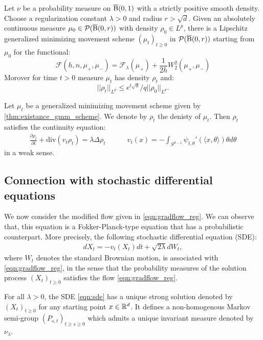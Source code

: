\begin{thm} \label{thm:existance_gmm_scheme}
Let $\nu$ be a probability measure on $\operatorname{\overline{B}}(0,1)$ with a strictly positive smooth density. Choose a regularization constant $\lambda > 0$ and radius $r > \sqrt{d}$. Given an absolutely continuous measure $\mu_0 \in \mathcal{P}(\operatorname{\overline{B}}(0,r))$ with density $\rho_0 \in L^p$, there is a Lipschitz generalized minimizing movement scheme $(\mu_t)_{t\geq 0}$ in $\mathcal{P}(\operatorname{\overline{B}}(0,r))$ starting from $\mu_0$ for the functional:
\[
\mathcal{F}(h, n , \mu_+, \mu_-) = \mathcal{F}_{\lambda}(\mu_+) + \frac{1}{2h}W_2^2(\mu_+, \mu_-)
\]
Morover for time $t > 0$ measure $\mu_t$ has density $\rho_t$ and:
\[
||\rho_t||_{L^p} \leq e^{t\sqrt{d}}/q ||\rho_0||_{L^p}.
\]
\end{thm}


\begin{thm}
Let $\mu_t$ be a generalized minimizing movement scheme given by \ref{thm:existance_gmm_scheme}. We denote by $\rho_t$ the denisty of $\mu_t$. Then $\rho_t$ satisfies the continuity equation:
\begin{align}
\frac{\partial \rho_t}{\partial t} + \text{div}(v_t \rho_t) = \lambda \Delta \rho_t  \quad \quad \quad v_t(x) = - \int_{S^{d-1}} \psi_{t, \theta}'(\langle x , \theta \rangle ) \theta d\theta  \label{eqn:gradflow_reg}
\end{align}
in a weak sense.
\end{thm}


\subsection{Connection with stochastic differential equations}

We now consider the modified flow given in \eqref{eqn:gradflow_reg}. We can observe that, this equation is a Fokker-Planck-type equation that has a probabilistic counterpart. More precisely, the following stochastic differential equation (SDE):
\begin{align}
d X_t = - v_t(X_t) dt + \sqrt{2 \lambda } d W_t, \label{eqn:sde}
\end{align}
where $W_t$ denotes the standard Brownian motion, is associated with \eqref{eqn:gradflow_reg}, in the sense that the probability measures of the solution process $(X_t)_{t\geq0}$ satisfies the flow \eqref{eqn:gradflow_reg}.  

\begin{assumption}
\label{asmp:sde_ergo}
For all $\lambda >0$, the SDE  \eqref{eqn:sde} has a unique strong solution denoted by $(X_t)_{t\geq 0}$ for any starting point $x \in \mathbb{R}^d$. It defines a non-homogenous Markov semi-group $(P_{s,t})_{t\geq s\geq 0}$ which admits a unique invariant measure denoted by $\nu_\lambda$. 
\end{assumption}



